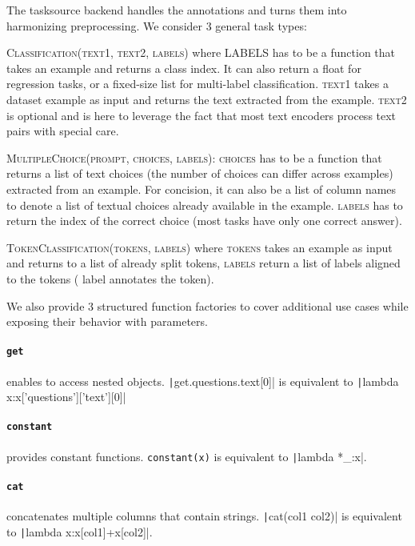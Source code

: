 \documentclass[11pt]{article}
\begin{document}
The tasksource backend handles the annotations and turns them into harmonizing preprocessing. We consider 3 general task types:

\textsc{Classification(text1, text2, labels)} where \textsc{LABELS} has to be a function that takes an example and returns a class index. It can also return a float for regression tasks, or a fixed-size list for multi-label classification. 
\textsc{text1} takes a dataset example as input and returns the text extracted from the example.
\textsc{text2} is optional and is here to leverage the fact that most text encoders process text pairs with special care.


\textsc{MultipleChoice(prompt, 
choices, labels)}:
\textsc{choices} has to be a function that returns a list of text choices (the number of choices can differ across examples) extracted from an example. For concision, it can also be a list of column names to denote a list of textual choices already available in the example.  \textsc{labels} has to return the index of the correct choice (most tasks have only one correct answer).

\textsc{TokenClassification(tokens, labels)} where \textsc{tokens} takes an example as input and returns to a list of already split tokens,  \textsc{labels} return a list of labels aligned to the tokens ( label annotates the  token).



We also provide 3 structured function factories to cover additional use cases while exposing their behavior with parameters.

 \paragraph{\texttt{get}} enables to access nested objects. \texttt|get.questions.text[0]| is equivalent to \texttt|lambda x:x['questions']['text'][0]|

\paragraph{\texttt{constant}} provides constant functions. \texttt{constant(x)} is equivalent to \texttt|lambda *_:x|.

\paragraph{\texttt{cat}} concatenates multiple columns that contain strings. \texttt|cat(col1 col2)| is equivalent to \texttt|lambda x:x[col1]+x[col2]|.
\end{document}
